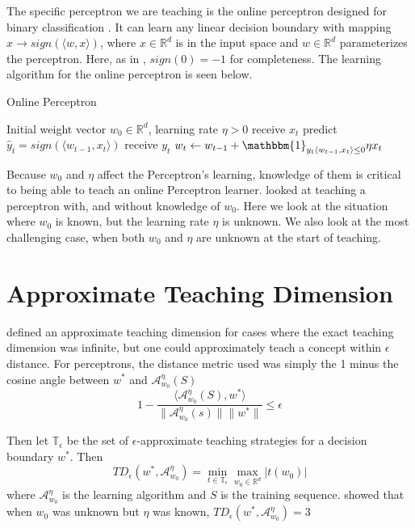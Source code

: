 \documentclass{article}
\newcommand{\learn}{\mathcal{A}_{w_0}^\eta}
\begin{document}
The specific perceptron we are teaching is the online perceptron
designed for binary classification \cite{perceptron_algo}. It can learn any
linear decision boundary with mapping $x \to sign(\langle w, x \rangle)$, where
$x \in \mathbb{R}^d$ is in the input space and $w \in \mathbb{R}^d$
parameterizes the perceptron. Here, as in \cite{perceptron}, $sign(0) = -1$ for
completeness. The learning algorithm for the online perceptron is seen below.

\begin{algorithm}
\caption{Online Perceptron}
\begin{algorithmic}[1]
	\REQUIRE Initial weight vector $w_0 \in \mathbb{R}^d$, learning rate $\eta > 0$
    	\STATE receive $x_t$
    	\STATE predict $\hat{y}_t = sign(\langle w_{t-1} , x_t \rangle)$
    	\STATE receive $y_t$
    	\STATE $w_t \leftarrow w_{t-1} + \mathbbm{1}_{y_t \langle w_{t-1} , x_t \rangle \leq 0} \eta x_t$
    \ENDFOR
\end{algorithmic}
\end{algorithm}

Because $w_0$ and $\eta$ affect the Perceptron's learning, knowledge of them is
critical to being able to teach an online Perceptron learner. \cite{perceptron}
looked at teaching a perceptron with, and without knowledge of $w_0$. Here we
look at the situation where $w_0$ is known, but the learning rate $\eta$ is
unknown. We also look at the most challenging case, when both $w_0$ and $\eta$
are unknown at the start of teaching. 

\section{Approximate Teaching Dimension}
\cite{perceptron}  defined an approximate teaching dimension for cases where
the exact teaching dimension was infinite, but one could approximately teach a concept within $\epsilon$ distance. For perceptrons, the distance metric used was simply the 1 minus the cosine angle between $w^*$ and $\learn(S)$
$$
1 -\frac{\langle \learn(S), w^* \rangle}{\lVert \learn(s) \rVert \lVert w^* \rVert} \leq \epsilon
$$

Then let $\mathbb{T}_\epsilon$ be the set of $\epsilon$-approximate teaching strategies for a decision boundary $w^*$. Then
$$
TD_\epsilon(w^*, \learn) = \min_{t \in 
\mathbb{T}_\epsilon} \max_{w_0 \in 
\mathbb{R}^d} \lvert t(w_0) \rvert
$$
where $\learn$ is the learning algorithm and $S$ is the training sequence. 
\cite{perceptron} showed that when $w_0$ was unknown but $\eta$ was known, $TD_\epsilon(w^*, \learn) = 3$
\end{document}
